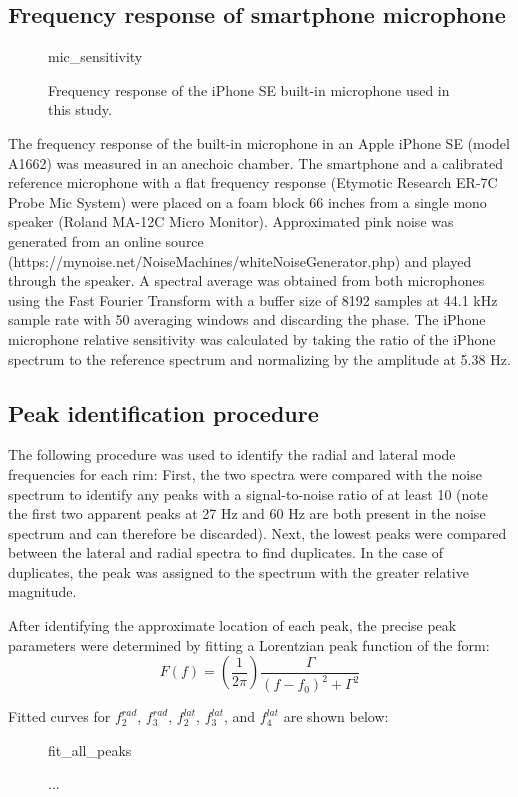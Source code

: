 \documentclass[../../thesis.tex]{subfiles}
\begin{document}
\subsection{Frequency response of smartphone microphone}
\label{app:mic_cal}

\begin{figure}[h]
\centering
{mic_sensitivity}
\caption{Frequency response of the iPhone SE built-in microphone used in this study.}
\label{fig:mic_sensitivity}
\end{figure}

The frequency response of the built-in microphone in an Apple iPhone SE (model A1662) was measured in an anechoic chamber. The smartphone and a calibrated reference microphone with a flat frequency response (Etymotic Research ER-7C Probe Mic System) were placed on a foam block 66 inches from a single mono speaker (Roland MA-12C Micro Monitor). Approximated pink noise was generated from an online source (https://mynoise.net/NoiseMachines/whiteNoiseGenerator.php) and played through the speaker. A spectral average was obtained from both microphones using the Fast Fourier Transform with a buffer size of 8192 samples at 44.1 kHz sample rate with 50 averaging windows and discarding the phase. The iPhone microphone relative sensitivity was calculated by taking the ratio of the iPhone spectrum to the reference spectrum and normalizing by the amplitude at 5.38 Hz.

\subsection{Peak identification procedure}
\label{app:peak_fits}

The following procedure was used to identify the radial and lateral mode frequencies for each rim: First, the two spectra were compared with the noise spectrum to identify any peaks with a signal-to-noise ratio of at least 10 (note the first two apparent peaks at 27 Hz and 60 Hz are both present in the noise spectrum and can therefore be discarded). Next, the lowest peaks were compared between the lateral and radial spectra to find duplicates. In the case of duplicates, the peak was assigned to the spectrum with the greater relative magnitude.

After identifying the approximate location of each peak, the precise peak parameters were determined by fitting a Lorentzian peak function of the form:
\begin{equation}
\label{eq:ema_peak_fit}
F(f) = \left(\frac{1}{2\pi}\right) \frac{\Gamma}{(f-f_0)^2 + \Gamma^2}
\end{equation}

Fitted curves for $f_2^{rad}$, $f_3^{rad}$, $f_2^{lat}$, $f_3^{lat}$, and $f_4^{lat}$ are shown below:

\begin{figure}
\centering
{fit_all_peaks}
\caption{...}
\label{fig:ema_all_peaks}
\end{figure}
\end{document}
